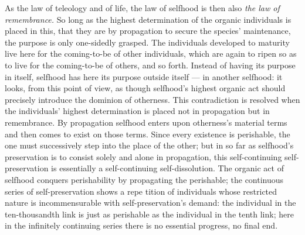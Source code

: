 \documentclass[12pt,a4paper]{book}
\begin{document}
As the law of teleology and of life, the law of selfhood is then also
\emph{the law of remembrance.} So long as the highest determination of the
organic individuals is placed in this, that they are by propagation to secure the
species' maintenance, the purpose is only one-sidedly grasped.
The individuals developed to maturity live here for the coming-to-be of other
individuals, which are again to ripen so as to live for the coming-to-be of
others, and so forth. Instead of having its purpose in itself, selfhood has here
its purpose outside itself --- in another selfhood: it looks, from this point of
view, as though selfhood's highest organic act should precisely introduce the
dominion of otherness. This contradiction is resolved when the individuals'
highest determination is placed not in propagation but in remembrance. By
propagation selfhood enters upon otherness's material terms and then comes to
exist on those terms. Since every existence is perishable, the one must
successively step into the place of the other; but in so far as selfhood's
preservation is to consist solely and alone in propagation, this self-continuing
self-preservation is essentially a self-continuing self-dissolution. The organic
act of selfhood conquers perishability by propagating the perishable; the
continuous series of self-preservation shows a repe%
tition of individuals whose restricted nature is incommensurable with
self-preservation's demand: the individual in the ten-thousandth link is just as
perishable as the individual in the tenth link; here in the infinitely continuing
series there is no essential progress, no final end.
\end{document}
